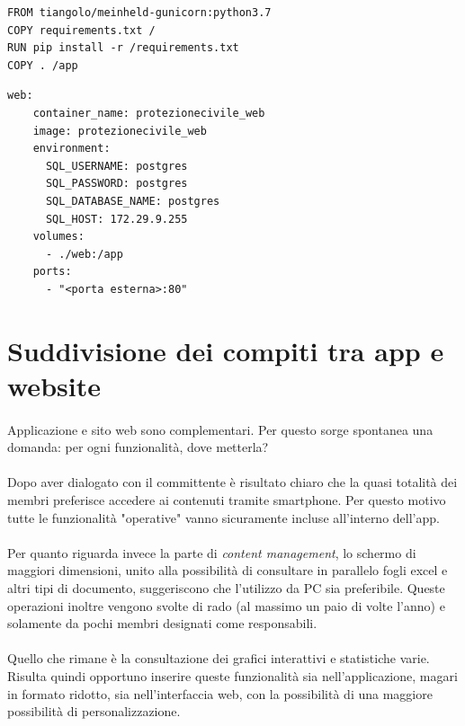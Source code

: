 \documentclass[11pt,a4paper,english]{article}
\begin{document}
\begin{lstlisting}[caption=Dockerfile]
FROM tiangolo/meinheld-gunicorn:python3.7
COPY requirements.txt /
RUN pip install -r /requirements.txt
COPY . /app
\end{lstlisting}

\begin{lstlisting}[caption=File di configurazione per Docker compose]
web:
    container_name: protezionecivile_web
    image: protezionecivile_web
    environment:
      SQL_USERNAME: postgres
      SQL_PASSWORD: postgres
      SQL_DATABASE_NAME: postgres
      SQL_HOST: 172.29.9.255
    volumes:
      - ./web:/app
    ports:
      - "<porta esterna>:80"
\end{lstlisting}


\newpage
\section{Suddivisione dei compiti tra app e website}

\paragraph{} Applicazione e sito web sono complementari. Per questo sorge spontanea una domanda: per ogni funzionalità, dove metterla? 

\paragraph{} Dopo aver dialogato con il committente è risultato chiaro che la quasi totalità dei membri preferisce accedere ai contenuti tramite smartphone. Per questo motivo tutte le funzionalità "operative" vanno sicuramente incluse all'interno dell'app. 

\paragraph{} Per quanto riguarda invece la parte di \emph{content management}, lo schermo di maggiori dimensioni, unito alla possibilità di consultare in parallelo fogli excel e altri tipi di documento, suggeriscono che l'utilizzo da PC sia preferibile. Queste operazioni inoltre vengono svolte di rado (al massimo un paio di volte l'anno) e solamente da pochi membri designati come responsabili. 

\paragraph{} Quello che rimane è la consultazione dei grafici interattivi e statistiche varie. Risulta quindi opportuno inserire queste funzionalità sia nell'applicazione, magari in formato ridotto, sia nell'interfaccia web, con la possibilità di una maggiore possibilità di personalizzazione.
\end{document}
